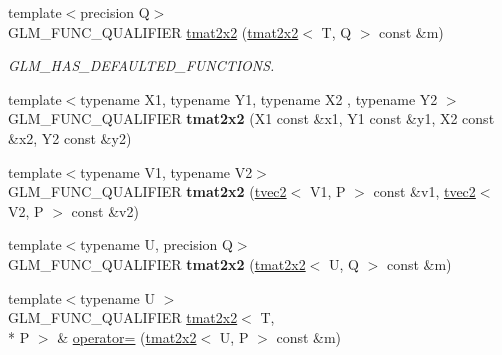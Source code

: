 \begin{DoxyCompactItemize}
\item 
\hypertarget{structglm_1_1tmat2x2_a183612b4e6b8300c93d45dc3c1bb6ff2}{{\footnotesize template$<$precision Q$>$ }\\G\-L\-M\-\_\-\-F\-U\-N\-C\-\_\-\-Q\-U\-A\-L\-I\-F\-I\-E\-R \hyperlink{structglm_1_1tmat2x2_a183612b4e6b8300c93d45dc3c1bb6ff2}{tmat2x2} (\hyperlink{structglm_1_1tmat2x2}{tmat2x2}$<$ T, Q $>$ const \&m)}\label{structglm_1_1tmat2x2_a183612b4e6b8300c93d45dc3c1bb6ff2}

\begin{DoxyCompactList}\small\item\em G\-L\-M\-\_\-\-H\-A\-S\-\_\-\-D\-E\-F\-A\-U\-L\-T\-E\-D\-\_\-\-F\-U\-N\-C\-T\-I\-O\-N\-S. \end{DoxyCompactList}\item 
\hypertarget{structglm_1_1tmat2x2_a49088761b4a3aaef14400d8e5fc51bc8}{{\footnotesize template$<$typename X1, typename Y1, typename X2 , typename Y2 $>$ }\\G\-L\-M\-\_\-\-F\-U\-N\-C\-\_\-\-Q\-U\-A\-L\-I\-F\-I\-E\-R {\bfseries tmat2x2} (X1 const \&x1, Y1 const \&y1, X2 const \&x2, Y2 const \&y2)}\label{structglm_1_1tmat2x2_a49088761b4a3aaef14400d8e5fc51bc8}

\item 
\hypertarget{structglm_1_1tmat2x2_a62395ad6e9a11a42689e7cc9ee3b6302}{{\footnotesize template$<$typename V1, typename V2$>$ }\\G\-L\-M\-\_\-\-F\-U\-N\-C\-\_\-\-Q\-U\-A\-L\-I\-F\-I\-E\-R {\bfseries tmat2x2} (\hyperlink{structglm_1_1tvec2}{tvec2}$<$ V1, P $>$ const \&v1, \hyperlink{structglm_1_1tvec2}{tvec2}$<$ V2, P $>$ const \&v2)}\label{structglm_1_1tmat2x2_a62395ad6e9a11a42689e7cc9ee3b6302}

\item 
\hypertarget{structglm_1_1tmat2x2_a2441e71c7648e358d5e65f2d21ed123a}{{\footnotesize template$<$typename U, precision Q$>$ }\\G\-L\-M\-\_\-\-F\-U\-N\-C\-\_\-\-Q\-U\-A\-L\-I\-F\-I\-E\-R {\bfseries tmat2x2} (\hyperlink{structglm_1_1tmat2x2}{tmat2x2}$<$ U, Q $>$ const \&m)}\label{structglm_1_1tmat2x2_a2441e71c7648e358d5e65f2d21ed123a}

\item 
\hypertarget{structglm_1_1tmat2x2_a44d29639987fd39514ae079271487363}{{\footnotesize template$<$typename U $>$ }\\G\-L\-M\-\_\-\-F\-U\-N\-C\-\_\-\-Q\-U\-A\-L\-I\-F\-I\-E\-R \hyperlink{structglm_1_1tmat2x2}{tmat2x2}$<$ T, \\*
P $>$ \& \hyperlink{structglm_1_1tmat2x2_a44d29639987fd39514ae079271487363}{operator=} (\hyperlink{structglm_1_1tmat2x2}{tmat2x2}$<$ U, P $>$ const \&m)}\label{structglm_1_1tmat2x2_a44d29639987fd39514ae079271487363}


\end{DoxyCompactItemize}
